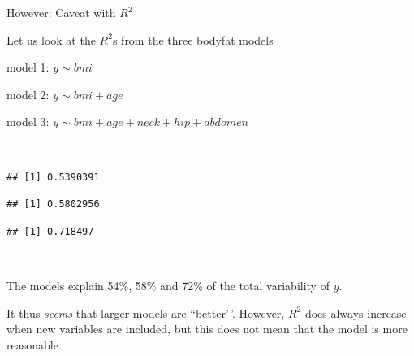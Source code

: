\documentclass[
  10pt,
  ignorenonframetext,
]{beamer}
\newenvironment{Shaded}{\begin{snugshade}}{\end{snugshade}}
\newcommand{\FunctionTok}[1]{\textcolor[rgb]{0.13,0.29,0.53}{\textbf{#1}}}
\newcommand{\NormalTok}[1]{#1}
\newcommand{\SpecialCharTok}[1]{\textcolor[rgb]{0.81,0.36,0.00}{\textbf{#1}}}
\begin{document}
\begin{frame}[fragile]
\begin{block}{However: Caveat with \(R^2\)}
\protect\hypertarget{however-caveat-with-r2}{}
\(~\)

Let us look at the \(R^2\)s from the three bodyfat models

\vspace{2mm}

model 1: \(y\sim bmi\)

model 2: \(y\sim bmi + age\)

model 3: \(y\sim bmi + age + neck + hip + abdomen\)

\(~\)

\tiny

\begin{Shaded}
\end{Shaded}

\begin{verbatim}
## [1] 0.5390391
\end{verbatim}

\begin{Shaded}
\end{Shaded}

\begin{verbatim}
## [1] 0.5802956
\end{verbatim}

\begin{Shaded}
\end{Shaded}

\begin{verbatim}
## [1] 0.718497
\end{verbatim}

\(~\)

\normalsize

The models explain 54\%, 58\% and 72\% of the total variability of
\(y\).

It thus \emph{seems} that larger models are ``better'\,'. However,
\(R^2\) does always increase when new variables are included, but this
does not mean that the model is more reasonable.
\end{block}
\end{frame}
\end{document}
